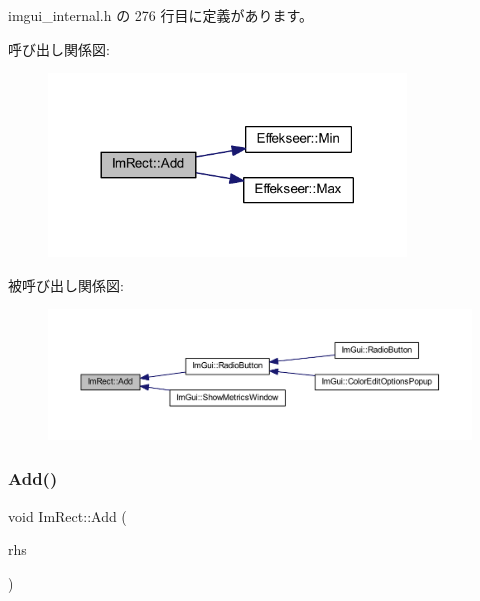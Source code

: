  imgui\+\_\+internal.\+h の 276 行目に定義があります。

呼び出し関係図\+:\nopagebreak
\begin{figure}[H]
\begin{center}
\leavevmode
\includegraphics[width=269pt]{struct_im_rect_a9d6cbef8c86ca01a16bb0fd35b457f88_cgraph}
\end{center}
\end{figure}
被呼び出し関係図\+:\nopagebreak
\begin{figure}[H]
\begin{center}
\leavevmode
\includegraphics[width=350pt]{struct_im_rect_a9d6cbef8c86ca01a16bb0fd35b457f88_icgraph}
\end{center}
\end{figure}
\mbox{\label{struct_im_rect_a9bcb65fd17843c74555291a522e9ebdf}} 
\subsubsection{\texorpdfstring{Add()}{Add()}\hspace{0.1cm}{\footnotesize\ttfamily [2/2]}}
{\footnotesize\ttfamily void Im\+Rect\+::\+Add (\begin{DoxyParamCaption}\item[{const \mbox{\hyperlink{struct_im_rect}{Im\+Rect}} \&}]{rhs }\end{DoxyParamCaption})\hspace{0.3cm}{\ttfamily [inline]}}



